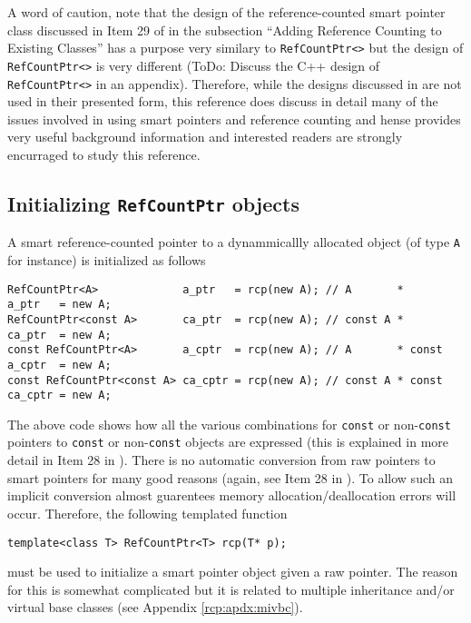 A word of caution, note that the design of the reference-counted smart
pointer class discussed in Item 29 of {}\cite{ref:meyers_1996} in the
subsection ``Adding Reference Counting to Existing Classes'' has a
purpose very similary to {}\texttt{RefCountPtr<>} but the design of
{}\texttt{RefCountPtr<>} is very different (ToDo: Discuss the C++
design of {}\texttt{RefCountPtr<>} in an appendix).  Therefore, while
the designs discussed in {}\cite{ref:meyers_1996} are not used in
their presented form, this reference does discuss in detail many of
the issues involved in using smart pointers and reference counting and
hense provides very useful background information and interested
readers are strongly encurraged to study this reference.

%
\subsection{Initializing {}\texttt{RefCountPtr} objects}
\label{rcp:sec:init-rcp-objects}
%

A smart reference-counted pointer to a dynammicallly allocated object
(of type {}\texttt{A} for instance) is initialized as follows
%
{\scriptsize\begin{verbatim}
RefCountPtr<A>             a_ptr   = rcp(new A); // A       *       a_ptr   = new A;
RefCountPtr<const A>       ca_ptr  = rcp(new A); // const A *       ca_ptr  = new A;
const RefCountPtr<A>       a_cptr  = rcp(new A); // A       * const a_cptr  = new A;
const RefCountPtr<const A> ca_cptr = rcp(new A); // const A * const ca_cptr = new A;
\end{verbatim}}
%
The above code shows how all the various combinations for
{}\texttt{const} or non-{}\texttt{const} pointers to {}\texttt{const}
or non-{}\texttt{const} objects are expressed (this is explained in
more detail in Item 28 in {}\cite{ref:meyers_1996}).  There is no
automatic conversion from raw pointers to smart pointers for many good
reasons (again, see Item 28 in {}\cite{ref:meyers_1996}).  To allow such
an implicit conversion almost guarentees memory
allocation/deallocation errors will occur.  Therefore, the following
templated function
%
{\scriptsize\begin{verbatim}
template<class T> RefCountPtr<T> rcp(T* p);
\end{verbatim}}
%
\noindent{}
must be used to initialize a smart pointer object given a raw pointer.
The reason for this is somewhat complicated but it is related to
multiple inheritance and/or virtual base classes (see Appendix
{}\ref{rcp:apdx:mivbc}).

